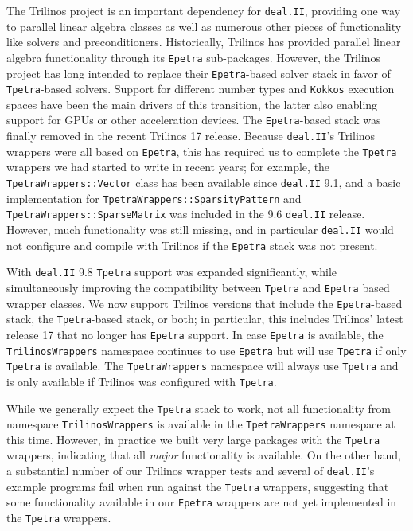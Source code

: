 \documentclass{ansarticle-preprint}
\newcommand{\specialword}[1]{\texttt{#1}}
\newcommand{\dealii}{{\specialword{deal.II}}\xspace}
\newcommand{\epetra}{{\specialword{Epetra}}\xspace}
\newcommand{\tpetra}{{\specialword{Tpetra}}\xspace}
\begin{document}
The Trilinos project is an important
dependency for \dealii{}, providing one way
to parallel linear algebra classes as well as numerous other pieces of
functionality like solvers and preconditioners. Historically, Trilinos has
provided parallel linear algebra functionality through its \epetra{}
sub-packages. However, the Trilinos project has long intended
to replace their \epetra{}-based solver stack in favor of
\tpetra{}-based solvers. Support for different number
types and \texttt{Kokkos} execution spaces have been the main
drivers of this transition, the latter also enabling support for GPUs or other
acceleration devices. The \epetra{}-based stack was finally removed
in the recent Trilinos 17 release. Because \dealii{}'s
Trilinos wrappers were all based on \epetra{}, this
has required us to complete the \tpetra{} wrappers we had
started to write in recent years; for example, the
\texttt{TpetraWrappers::Vector} class has been available since \dealii{}
9.1, and a basic implementation for
\texttt{TpetraWrappers::SparsityPattern} and
\texttt{TpetraWrappers::SparseMatrix} was included in the 9.6
\dealii release. However, much functionality was still missing,
and in particular \dealii would not configure
and compile with Trilinos if the \epetra{} stack was not present.

With \dealii 9.8 \tpetra{} support was expanded
significantly, while simultaneously improving the compatibility between \tpetra{} and
\epetra based wrapper classes. We now support Trilinos
versions that include the \epetra{}-based stack, the \tpetra{}-based stack,
or both; in particular, this includes
Trilinos' latest release 17 that no longer has \epetra{} support.
In case \epetra{} is available, the \texttt{TrilinosWrappers} namespace
continues to use \epetra{} but will use \tpetra{}
if only \tpetra{} is available. The \texttt{TpetraWrappers}
namespace will always use \tpetra{} and is only available if
Trilinos was configured with \tpetra{}.

While we generally expect the \tpetra{}
stack to work, not all functionality from namespace
\texttt{TrilinosWrap\allowbreak{}pers} is available in the
\texttt{TpetraWrappers} namespace at this time. However, in practice we
built very large packages with the \tpetra{} wrappers,
indicating that all \textit{major} functionality is available. On the
other hand, a substantial number of our Trilinos wrapper tests and
several of \dealii{}'s example programs fail when
run against the \tpetra{} wrappers, suggesting that some
functionality available in our \epetra{} wrappers are not
yet implemented in the \tpetra{} wrappers.
\end{document}

